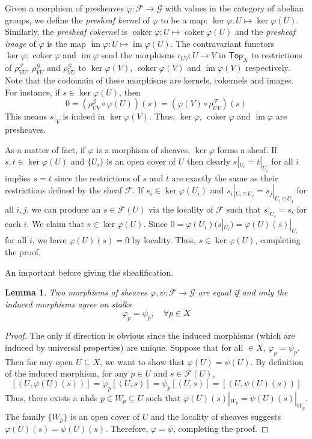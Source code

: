 \documentclass[12pt]{article}
\newtheorem{lemma}{Lemma}[subsection]
\theoremstyle{remark}
\newcommand{\coker}[0]{\operatorname{coker}}
\newcommand{\im}[0]{\operatorname{im}}
\newcommand{\Top}[0]{\mathsf{Top}}
\begin{document}
	Given a morphism of presheaves $\varphi:\mathscr F\to \mathscr G$ with values in the category of abelian groups, we define the \textit{presheaf kernel} of $\varphi$ to be a map: $\ker\varphi: U\mapsto \ker\varphi(U)$. Similarly, the \textit{presheaf cokernel} is $\coker\varphi:U\mapsto\coker\varphi(U)$ and the \textit{presheaf image} of $\varphi$ is the map $\im\varphi: U\mapsto \im\varphi(U)$. The contravariant functors $\ker\varphi,\coker\varphi$ and $\im\varphi$ send the morphisms $\iota_{UV}: U\to V$ in $\Top_X$ to restrictions of $\rho_{VU}^{\mathscr F}$, $\rho_{VU}^\mathscr G$ and $\rho_{VU}^\mathscr G$ to $\ker\varphi(V)$, $\coker\varphi(V)$ and $\im\varphi(V)$ respectively. Note that the codomain of these morphisms are kernels, cokernels and images. For instance, if $s\in\ker\varphi(U)$, then
	\[0=(\rho^\mathscr G_{UV}\circ \varphi(U))(s)=(\varphi(V)\circ \rho^\mathscr F_{UV})(s)\]
	This means $s|_V$ is indeed in $\ker\varphi(V)$. Thus, $\ker\varphi$, $\coker\varphi$ and $\im\varphi$ are presheaves.
	
	As a matter of fact, if $\varphi$ is a morphism of sheaves, $\ker\varphi$ forms a sheaf. If $s,t\in\ker\varphi(U)$ and $\{U_i\}$ is an open cover of $U$ then clearly $s|_{U_i}=t|_{U_i}$ for all $i$ implies $s=t$ since the restrictions of $s$ and $t$ are exactly the same as their restrictions defined by the sheaf $\mathscr F$. If $s_i\in \ker\varphi(U_i)$ and $s_i|_{U_i\cap U_j}=s_j|_{U_i\cap U_j}$ for all $i, j$, we can produce an $s\in \mathscr F(U)$ via the locality of $\mathscr F$ such that $s|_{U_i}=s_i$ for each $i$. We claim that $s\in \ker\varphi(U)$. Since $0=\varphi(U_i)(s|_{U_i})=\varphi(U)(s)|_{U_i}$ for all $i$, we have $\varphi(U)(s)=0$ by locality. Thus, $s\in \ker\varphi(U)$, completing the proof.
	
	An important before giving the sheafification.
	\begin{lemma}\label{l121}
	Two morphisms of sheaves $\varphi,\psi:\mathscr F\to\mathscr G$ are equal if and only the induced morphisms agree on stalks
	\[\varphi_p=\psi_p,\quad\forall p\in X\]
	\end{lemma}
	\begin{proof}
	The only if direction is obvious since the induced morphisms (which are induced by universal properties) are unique. Suppose that for all $\in X$, $\varphi_p=\psi_p$. Then for any open $U\subseteq X$, we want to show that $\varphi(U)=\psi(U)$. By definition of the induced morphism, for any $p\in U$ and $s\in\mathscr F(U)$,
	\[[(U, \varphi(U)(s))]=\varphi_p[(U, s)]=\psi_p[(U, s)]=[(U, \psi(U)(s))]\]
	Thus, there exists a nhds $p\in W_p\subseteq U$ such that $\varphi(U)(s)|_{W_p}=\psi(U)(s)|_{W_p}$. The family $\{W_p\}$ is an open cover of $U$ and the locality of sheaves suggests $\varphi(U)(s)=\psi(U)(s)$. Therefore, $\varphi=\psi$, completing the proof.
	\end{proof}
	
\end{document}
